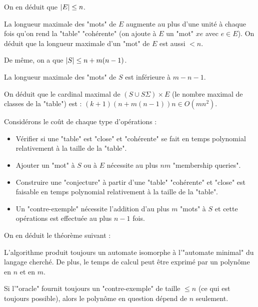 On en déduit que $\left|E\right| \leq n$.

La longueur maximale des "mots" de $E$ augmente au plus d'une unité à chaque fois qu'on rend la "table" "cohérente"
(on ajoute à $E$ un "mot" $xe$ avec $e \in E$). On déduit que la longueur maximale d'un "mot" de $E$ est aussi $<n$.

De même, on a que  $\left|S\right| \leq n + m(n-1)$. %

La longueur maximale des "mots" de $S$ est inférieure à $m - n -1$.


On déduit que le cardinal maximal de $(S \cup S \Sigma) \times E$ (le nombre maximal de classes de la "table") est : $(k+1)(n+m(n-1))n \in O(mn^2)$.


Considérons le coût de chaque type d'opérations :
\begin{itemize}
	\item Vérifier si une "table" est "close" et "cohérente" se fait en temps polynomial relativement à la taille de la "table".
	\item Ajouter un "mot" à $S$ ou à $E$ nécessite au plus $nm$ "membership queries".
	\item Construire une "conjecture" à partir d'une "table" "cohérente" et "close" est faisable en temps polynomial relativement à
	      la taille de la "table".
	\item Un "contre-exemple" nécessite l'addition d'au plus $m$ "mots" à $S$ et cette opérations est effectuée au plus $n-1$ fois.
\end{itemize}

\vspace{0.5cm}

On en déduit le théorème suivant :

\begin{theorem}
	L'algorithme produit toujours un automate isomorphe à l'"automate minimal" du langage cherché.
	De plus, le temps de calcul peut être exprimé par un polynôme en $n$ et en $m$.
\end{theorem}

\begin{remarque}
	Si l'"oracle" fournit toujours un "contre-exemple" de taille $\leq n$ (ce qui est toujours possible), alors le polynôme en question dépend de $n$ seulement.
\end{remarque}

